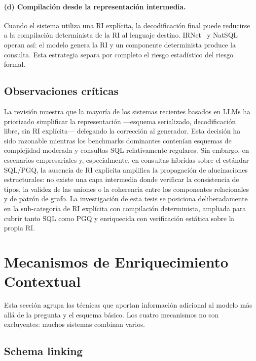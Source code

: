 \paragraph{(d) Compilación desde la representación intermedia.} Cuando
el sistema utiliza una RI explícita, la decodificación final puede
reducirse a la compilación determinista de la RI al lenguaje destino.
IRNet~\cite{IRNet} y NatSQL~\cite{gan2021natsql}
operan así: el modelo genera la RI y un componente determinista produce
la consulta. Esta estrategia separa por completo el riesgo estadístico
del riesgo formal.

\subsection{Observaciones críticas}
\label{subsec:sota-d3-obs}

La revisión muestra que la mayoría de los sistemas recientes basados en
\acp{LLM} ha priorizado simplificar la representación ---esquema
serializado, decodificación libre, sin RI explícita--- delegando la
corrección al generador. Esta decisión ha sido razonable mientras los
benchmarks dominantes contenían esquemas de complejidad moderada y
consultas SQL relativamente regulares. Sin embargo, en escenarios
empresariales y, especialmente, en consultas híbridas sobre el estándar
\ac{SQL}/\ac{PGQ}, la ausencia de RI explícita amplifica la propagación
de alucinaciones estructurales: no existe una capa intermedia donde
verificar la consistencia de tipos, la validez de las uniones o la
coherencia entre los componentes relacionales y de patrón de grafo.
La investigación de esta tesis se posiciona deliberadamente en la
sub-categoría de RI explícita con compilación determinista, ampliada
para cubrir tanto SQL como PGQ y enriquecida con verificación estática
sobre la propia RI.

\section{Mecanismos de Enriquecimiento Contextual}
\label{sec:sota-d4-enriquecimiento}

Esta sección agrupa las técnicas que aportan información adicional al
modelo más allá de la pregunta y el esquema básico. Los cuatro
mecanismos no son excluyentes: muchos sistemas combinan varios.

\subsection{Schema linking}
\label{subsec:sota-d4-schemalinking}

